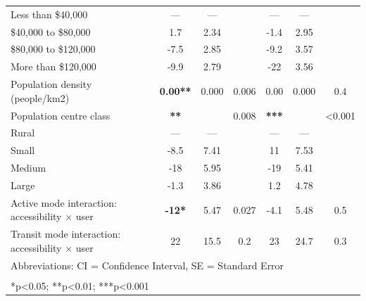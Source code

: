 \documentclass[preprint, 3p,
authoryear]{elsarticle} %
\begin{document}
\begin{table}
\begin{tabular}[t]{lcccccc}
\hspace{1em}Less than \$40,000 & — & — &  & — & — & \\
\hspace{1em}\$40,000 to \$80,000 & 1.7 & 2.34 &  & -1.4 & 2.95 & \\
\hspace{1em}\$80,000 to \$120,000 & -7.5 & 2.85 &  & -9.2 & 3.57 & \\
\hspace{1em}More than \$120,000 & -9.9 & 2.79 &  & -22 & 3.56 & \\
\addlinespace
Population density (people/km2) & \textbf{0.00**} & 0.000 & 0.006 & 0.00 & 0.000 & 0.4\\
Population centre class & \textbf{**} &  & 0.008 & \textbf{***} &  & <0.001\\
\hspace{1em}Rural & — & — &  & — & — & \\
\hspace{1em}Small & -8.5 & 7.41 &  & 11 & 7.53 & \\
\hspace{1em}Medium & -18 & 5.95 &  & -19 & 5.41 & \\
\addlinespace
\hspace{1em}Large & -1.3 & 3.86 &  & 1.2 & 4.78 & \\
Active mode interaction: accessibility × user & \textbf{-12*} & 5.47 & 0.027 & -4.1 & 5.48 & 0.5\\
Transit mode interaction: accessibility × user & 22 & 15.5 & 0.2 & 23 & 24.7 & 0.3\\
\bottomrule
\multicolumn{7}{l}{\rule{0pt}{1em}Abbreviations: CI = Confidence Interval, SE = Standard Error}\\
\multicolumn{7}{l}{\textsuperscript{} *p<0.05; **p<0.01; ***p<0.001}\\
\end{tabular}
\end{table}

\renewcommand{\thetable}{A.4}
\end{document}
